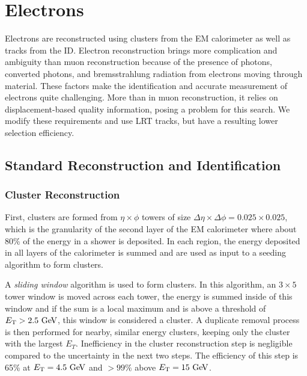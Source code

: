 


\section{Electrons}
\label{sec:elecreco}

Electrons are reconstructed using clusters from the \ac{EM} calorimeter as well as tracks from the \ac{ID}. Electron reconstruction brings more complication and ambiguity than muon reconstruction because of the presence of photons, converted photons, and bremsstrahlung radiation from electrons moving through material. These factors make the identification and accurate measurement of electrons quite challenging. More than in muon reconstruction, it relies on displacement-based quality information, posing a problem for this search. We modify these requirements and use \ac{LRT} tracks, but have a resulting lower selection efficiency. 

\subsection{Standard Reconstruction and Identification}


\subsubsection{Cluster Reconstruction}

First, clusters are formed from $\eta \times \phi$ towers of size $\Delta \eta \times \Delta \phi = 0.025 \times 0.025$, which is the granularity of the second layer of the \ac{EM} calorimeter where about 80\% of the energy in a shower is deposited. In each region, the energy deposited in all layers of the calorimeter is summed and are used as input to a seeding algorithm to form clusters. 

A \emph{sliding window} algorithm is used to form clusters. In this algorithm, an $3 \times 5$ tower window is moved across each tower, the energy is summed inside of this window and if the sum is a local maximum and is above a threshold of $\et > 2.5 \GeV$, this window is considered a cluster. A duplicate removal process is then performed for nearby, similar energy clusters, keeping only the cluster with the largest $E_{T}$. Inefficiency in the cluster reconstruction step is negligible compared to the uncertainty in the next two steps. The efficiency of this step is 65\% at $\et = 4.5 \GeV$ and $> 99\%$ above $\et = 15 \GeV$.

